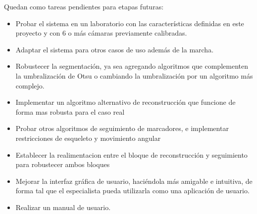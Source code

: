 Quedan como tareas pendientes para etapas futuras:
\begin{itemize}
	\item Probar el sistema en un laboratorio con las características definidas en este proyecto y con 6 o más cámaras previamente calibradas.
	\item Adaptar el sistema para otros casos de uso además de la marcha.
	\item Robustecer la segmentación, ya sea agregando algoritmos que complementen la umbralización de Otsu\cite{otsu} o cambiando la umbralización por un algoritmo más complejo.
	
	\item Implementar un algoritmo alternativo de reconstrucción que funcione de forma mas robusta para el caso real
	
	\item Probar otros algoritmos de seguimiento de marcadores, e implementar restricciones de esqueleto y movimiento angular
	
	\item Establecer la realimentacion entre el bloque de reconstrucción y seguimiento para robustecer ambos bloques 	
	
	\item Mejorar la interfaz gráfica de usuario, haciéndola más amigable e intuitiva, de forma tal que el especialista pueda utilizarla como una aplicación de usuario.
	\item Realizar un manual de usuario.
\end{itemize}